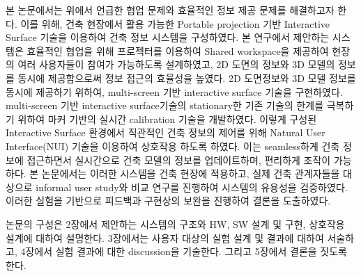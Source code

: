 




본 논문에서는 위에서 언급한 협업 문제와 효율적인 정보 제공 문제를 해결하고자 한다. 이를 위해, 건축 현장에서 활용 가능한 Portable projection 기반 Interactive Surface 기술을 이용하여 건축 정보 시스템을 구성하였다. 본 연구에서 제안하는 시스템은 효율적인 협업을 위해 프로젝터를 이용하여 Shared workspace을 제공하여 현장의 여러 사용자들이 참여가 가능하도록 설계하였고, 2D 도면의 정보와 3D 모델의 정보를 동시에 제공함으로써 정보 접근의 효율성을 높였다. 2D 도면정보와 3D 모델 정보를 동시에 제공하기 위하여, multi-screen 기반 interactive surface 기술\cite{coram_astrotouch:_2013,weiss_benddesk:_2010,wimmer_curve:_2010,benko_miragetable:_2012}을 구현하였다. multi-screen 기반 interactive surface기술의 stationary한 기존 기술의 한계를 극복하기 위하여 마커 기반의 실시간 calibration 기술을 개발하였다. 이렇게 구성된 Interactive Surface 환경에서 직관적인 건축 정보의 제어를 위해 Natural User Interface(NUI) 기술을 이용하여 상호작용 하도록 하였다. 이는 seamless하게 건축 정보에 접근하면서 실시간으로 건축 모델의 정보를 업데이트하며, 편리하게 조작이 가능하다. 
본 논문에서는 이러한 시스템을 건축 현장에 적용하고, 실제 건축 관계자들을 대상으로  informal user study와 비교 연구를 진행하여 시스템의 유용성을 검증하였다. 이러한 실험을 기반으로 피드백과 구현상의 보완을 진행하여 결론을 도출하였다.

논문의 구성은 2장에서 제안하는 시스템의 구조와 HW, SW 설계 및 구현, 상호작용 설계에 대하여 설명한다. 3장에서는 사용자 대상의 실험 설계 및 결과에 대하여 서술하고, 4장에서 실험 결과에 대한 discussion을 기술한다. 그리고 5장에서 결론을 짓도록 한다.



